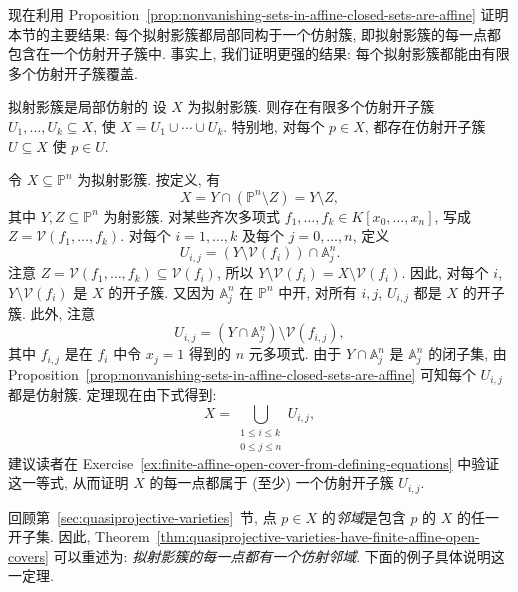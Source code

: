 现在利用 Proposition~\ref{prop:nonvanishing-sets-in-affine-closed-sets-are-affine} 证明本节的主要结果: 每个拟射影簇都局部同构于一个仿射簇, 即拟射影簇的每一点都包含在一个仿射开子簇中. 事实上, 我们证明更强的结果: 每个拟射影簇都能由有限多个仿射开子簇覆盖.

\begin{Theorem}{拟射影簇是局部仿射的}\leavevmode\label{thm:quasiprojective-varieties-have-finite-affine-open-covers}
设 $X$ 为拟射影簇. 则存在有限多个仿射开子簇 $U_{1},\ldots,U_{k}\subseteq X$, 使 $X=U_{1}\cup\cdots\cup U_{k}$. 特别地, 对每个 $p\in X$, 都存在仿射开子簇 $U\subseteq X$ 使 $p\in U$.
\end{Theorem}
\begin{Proof}
令 $X\subseteq\mathbb{P}^{n}$ 为拟射影簇. 按定义, 有
\[
  X=Y\cap(\mathbb{P}^{n}\setminus Z)=Y\setminus Z,
\]
其中 $Y,Z\subseteq\mathbb{P}^{n}$ 为射影簇. 对某些齐次多项式 $f_{1},\ldots,f_{k}\in K[x_{0},\ldots,x_{n}]$, 写成 $Z=\mathcal{V}(f_{1},\ldots,f_{k})$. 对每个 $i=1,\ldots,k$ 及每个 $j=0,\ldots,n$, 定义
\[
  U_{i,j}=(Y\setminus\mathcal{V}(f_{i}))\cap\mathbb{A}^{n}_{j}.
\]
注意 $Z=\mathcal{V}(f_{1},\ldots,f_{k})\subseteq\mathcal{V}(f_{i})$, 所以 $Y\setminus\mathcal{V}(f_{i})=X\setminus\mathcal{V}(f_{i})$. 因此, 对每个 $i$, $Y\setminus\mathcal{V}(f_{i})$ 是 $X$ 的开子簇. 又因为 $\mathbb{A}^{n}_{j}$ 在 $\mathbb{P}^{n}$ 中开, 对所有 $i,j$, $U_{i,j}$ 都是 $X$ 的开子簇. 此外, 注意
\[
  U_{i,j}=(Y\cap\mathbb{A}^{n}_{j})\setminus\mathcal{V}(f_{i,j}),
\]
其中 $f_{i,j}$ 是在 $f_{i}$ 中令 $x_{j}=1$ 得到的 $n$ 元多项式. 由于 $Y\cap\mathbb{A}^{n}_{j}$ 是 $\mathbb{A}^{n}_{j}$ 的闭子集, 由 Proposition~\ref{prop:nonvanishing-sets-in-affine-closed-sets-are-affine} 可知每个 $U_{i,j}$ 都是仿射簇. 定理现在由下式得到:
\[
  X=\bigcup_{\substack{1\le i\le k\\0\le j\le n}}U_{i,j},
\]
建议读者在 Exercise~\ref{ex:finite-affine-open-cover-from-defining-equations} 中验证这一等式, 从而证明 $X$ 的每一点都属于 (至少) 一个仿射开子簇 $U_{i,j}$.
\end{Proof}

回顾第~\ref{sec:quasiprojective-varieties}~节, 点 $p\in X$ 的\emph{邻域}是包含 $p$ 的 $X$ 的任一开子集. 因此, Theorem~\ref{thm:quasiprojective-varieties-have-finite-affine-open-covers} 可以重述为: \emph{拟射影簇的每一点都有一个仿射邻域}. 下面的例子具体说明这一定理.

